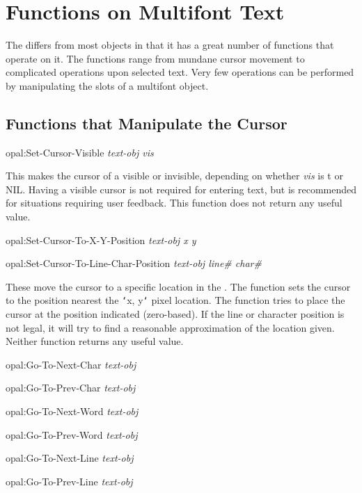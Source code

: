 \section{Functions on Multifont Text}
\label{multifont-fns}

The  differs from most objects in that it has a great
number of functions that operate on it.  The functions range
from mundane cursor movement to complicated operations upon selected
text.  Very few operations can be performed by manipulating the slots of a
multifont object.

\subsection{Functions that Manipulate the Cursor}

\begin{programexample}
opal:Set-Cursor-Visible {\it text-obj vis}\value{function}
\end{programexample}

This makes the cursor of a  visible or invisible, depending
on whether {\it vis} is {\sc t} or {\sc NIL}.  Having a visible cursor is
not required for entering text, but is recommended for situations
requiring user feedback.  This function does not return any useful value.

\begin{programexample}
opal:Set-Cursor-To-X-Y-Position {\it text-obj x y}\value{function}

opal:Set-Cursor-To-Line-Char-Position {\it text-obj line\# char\#}\value{function}
\end{programexample}

These move the cursor to a specific location in the .  The
function  sets the cursor to the position
nearest the {\tt\char`\<}x, y{\tt\char`\>} pixel location.  The function
 tries to place the cursor at the
position indicated (zero-based).  If the line or character
position is not legal, it will
try to find a reasonable approximation of the location given.  Neither
function returns any useful value.

\begin{programexample}
opal:Go-To-Next-Char {\it text-obj}\value{function}

opal:Go-To-Prev-Char {\it text-obj}\value{function}

opal:Go-To-Next-Word {\it text-obj}\value{function}

opal:Go-To-Prev-Word {\it text-obj}\value{function}

opal:Go-To-Next-Line {\it text-obj}\value{function}

opal:Go-To-Prev-Line {\it text-obj}\value{function}
\end{programexample}


